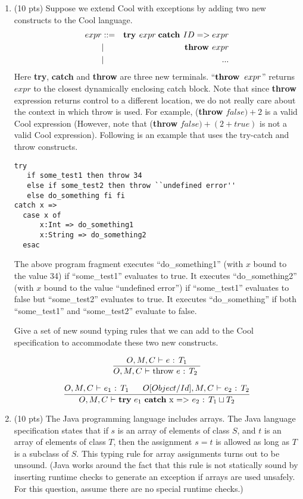 \documentclass[10pt]{article}
\newcommand{\infertext}[2]{\infer{{\textrm{#1}}}{#2}}
\begin{document}
\begin{enumerate}
\medskip
\item  (10 pts) Suppose we extend Cool with exceptions by adding two new constructs
to the Cool language.
\begin{eqnarray*}
  expr & ::= & \textit{\bf try } expr \;\textit{\bf catch } ID => expr \\
       & |   & \textit{\bf throw } expr \\
       & | & ...
\end{eqnarray*}
Here {\bf try}, {\bf catch} and {\bf throw} are three new terminals.
  ``${\bf throw }\;\; expr$'' returns $expr$ to the
  closest dynamically enclosing catch block.
Note that since {\bf throw} expression returns control to a different location, we do not really
  care about the context in which throw is used. For example,
({\bf throw} $false) + 2$ is a valid Cool expression (However, note that
  ({\bf throw} $false) + (2+true)$ is not a valid Cool expression).  Following is an example that uses the
try-catch and throw constructs.
\begin{verbatim}
try
   if some_test1 then throw 34
   else if some_test2 then throw ``undefined error''
   else do_something fi fi
catch x =>
  case x of
      x:Int => do_something1
      x:String => do_something2
  esac
\end{verbatim}

The above program fragment executes
  ``do\_something1'' (with $x$ bound to the value 34) if ``some\_test1''
  evaluates to \textsf{true}. It executes ``do\_something2'' (with $x$ bound to the
  value ``undefined error'') if ``some\_test1'' evaluates to \textsf{false} but
  ``some\_test2'' evaluates to \textsf{true}. It executes ``do\_something'' if both
  ``some\_test1'' and ``some\_test2'' evaluate to \textsf{false}.


Give a set of new sound typing rules that we can add to the Cool specification
to accommodate these two new constructs.

\[\infertext
      {$O,M,C$ $\vdash$ throw $e$ : $T_2$ }
      {\textrm{$O,M,C$ $\vdash$ $e$ : $T_1$}
      }
    \]


\[\infertext
      {$O,M,C$ $\vdash$ \textbf{try} $e_1$ \textbf{catch} x $=>$ $e_2$ : $T_1\sqcup T_2$}
      {\textrm{$O,M,C$ $\vdash$ $e_1$ : $T_1$\ \ \ \ \ $O[Object/Id],M,C$ $\vdash$ $e_2$ : $T_2$}
      }
    \]



\medskip
\item (10 pts) The Java programming language includes arrays.  The Java
language specification states that if $s$ is an array of elements of
class $S$, and $t$ is an array of elements of class $T$, then the
assignment $s = t$ is allowed as long as $T$ is a subclass of $S$.
This typing rule for array assignments turns out to be unsound. (Java
works around the fact that this rule is not statically sound by inserting
runtime checks to generate an exception if arrays are used
unsafely. For this question, assume there are no special runtime checks.)


\end{enumerate}
\end{document}
